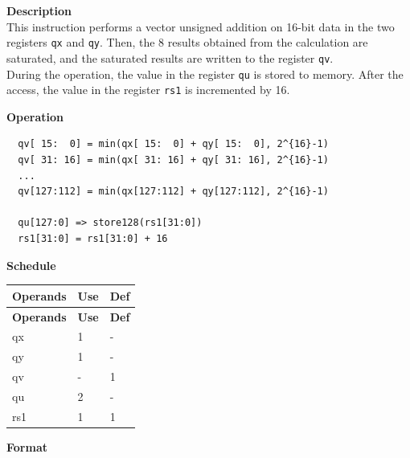 \textbf{Description}\\
This instruction performs a vector unsigned addition on 16-bit data in the two registers \lstinline{qx} and \lstinline{qy}. Then, the 8 results obtained from the calculation are saturated, and the saturated results are written to the register \lstinline{qv}.\\ During the operation, the value in the register \lstinline{qu} is stored to memory. After the access, the value in the register \lstinline{rs1} is incremented by 16.

\textbf{Operation}\\
\begin{lstlisting}
  qv[ 15:  0] = min(qx[ 15:  0] + qy[ 15:  0], 2^{16}-1)
  qv[ 31: 16] = min(qx[ 31: 16] + qy[ 31: 16], 2^{16}-1)
  ...
  qv[127:112] = min(qx[127:112] + qy[127:112], 2^{16}-1)

  qu[127:0] => store128(rs1[31:0])
  rs1[31:0] = rs1[31:0] + 16
\end{lstlisting}


\textbf{Schedule}\\
\begin{longtable}[c]{|l|l|l|}
    \hline
    \rowcolor{lightgray}
    \textbf{Operands} & \textbf{Use} & \textbf{Def} \\\hline
    \endfirsthead
    \hline
    \rowcolor{lightgray}
     \textbf{Operands} & \textbf{Use} & \textbf{Def} \\\hline
    \endhead
    \hline
    \endfoot

    qx & 1 & - \\\hline
  qy & 1 & - \\\hline
     qv & - & 1 \\\hline
     qu & 2 & - \\\hline
     rs1 & 1 & 1

\end{longtable}

\textbf{Format}\\

